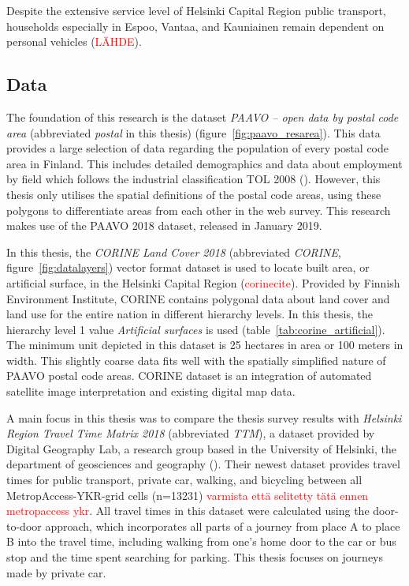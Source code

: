 Despite the extensive service level of Helsinki Capital Region public transport, households especially in Espoo, Vantaa, and Kauniainen remain dependent on personal vehicles (\textcolor{red}{LÄHDE}). 

\newpage
\subsection{Data}
\justify

The foundation of this research is the dataset \textit{PAAVO -- open data by postal code area} (abbreviated \textit{postal} in this thesis) (figure~\ref{fig:paavo_resarea}). This data provides a large selection of data regarding the population of every postal code area in Finland. This includes detailed demographics and data about employment by field which follows the industrial classification TOL 2008 (\cite{Tilastokeskus2008}). However, this thesis only utilises the spatial definitions of the postal code areas, using these polygons to differentiate areas from each other in the web survey. This research makes use of the PAAVO 2018 dataset, released in January 2019.

In this thesis, the \textit{CORINE Land Cover 2018} (abbreviated \textit{CORINE}, figure~\ref{fig:datalayers}) vector format dataset is used to locate built area, or artificial surface, in the Helsinki Capital Region (\textcolor{red}{corinecite}). Provided by Finnish Environment Institute, CORINE contains polygonal data about land cover and land use for the entire nation in different hierarchy levels. In this thesis, the hierarchy level 1 value \textit{Artificial surfaces} is used (table~\ref{tab:corine_artificial}). The minimum unit depicted in this dataset is 25 hectares in area or 100 meters in width. This slightly coarse data fits well with the spatially simplified nature of PAAVO postal code areas. CORINE dataset is an integration of automated satellite image interpretation and existing digital map data.

A main focus in this thesis was to compare the thesis survey results with \textit{Helsinki Region Travel Time Matrix 2018} (abbreviated \textit{TTM}), a dataset provided by Digital Geography Lab, a research group based in the University of Helsinki, the department of geosciences and geography (\cite{Tenkanen2018}). Their newest dataset provides travel times for public transport, private car, walking, and bicycling between all MetropAccess-YKR-grid cells (n=13231) \textcolor{red}{varmista että selitetty tätä ennen metropaccess ykr}. All travel times in this dataset were calculated using the door-to-door approach, which incorporates all parts of a journey from place A to place B into the travel time, including walking from one's home door to the car or bus stop and the time spent searching for parking. This thesis focuses on journeys made by private car.

